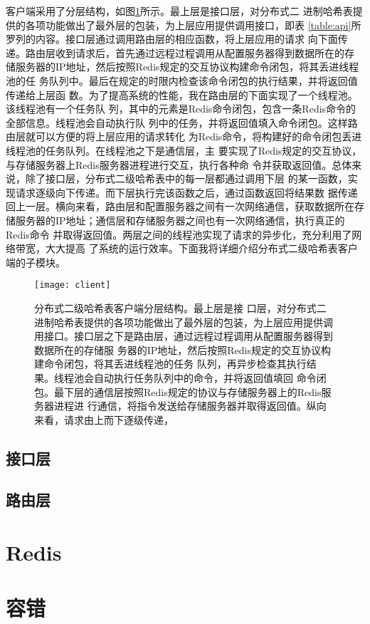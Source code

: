 客户端采用了分层结构，如图\ref{figure:client}所示。最上层是接口层，对分布式二
进制哈希表提供的各项功能做出了最外层的包装，为上层应用提供调用接口，即表
\ref{table:api}所罗列的内容。接口层通过调用路由层的相应函数，将上层应用的请求
向下面传递。路由层收到请求后，首先通过远程过程调用从配置服务器得到数据所在的存
储服务器的IP地址，然后按照Redis规定的交互协议构建命令闭包，将其丢进线程池的任
务队列中。最后在规定的时限内检查该命令闭包的执行结果，并将返回值传递给上层函
数。为了提高系统的性能，我在路由层的下面实现了一个线程池。该线程池有一个任务队
列，其中的元素是Redis命令闭包，包含一条Redis命令的全部信息。线程池会自动执行队
列中的任务，并将返回值填入命令闭包。这样路由层就可以方便的将上层应用的请求转化
为Redis命令，将构建好的命令闭包丢进线程池的任务队列。在线程池之下是通信层，主
要实现了Redis规定的交互协议，与存储服务器上Redis服务器进程进行交互，执行各种命
令并获取返回值。总体来说，除了接口层，分布式二级哈希表中的每一层都通过调用下层
的某一函数，实现请求逐级向下传递。而下层执行完该函数之后，通过函数返回将结果数
据传递回上一层。横向来看，路由层和配置服务器之间有一次网络通信，获取数据所在存
储服务器的IP地址；通信层和存储服务器之间也有一次网络通信，执行真正的Redis命令
并取得返回值。两层之间的线程池实现了请求的异步化，充分利用了网络带宽，大大提高
了系统的运行效率。下面我将详细介绍分布式二级哈希表客户端的子模块。
\begin{figure}
  \centering
  \texttt{[image: client]}
  \caption[分布式二级哈希表客户端]{分布式二级哈希表客户端分层结构。最上层是接
  口层，对分布式二进制哈希表提供的各项功能做出了最外层的包装，为上层应用提供调
  用接口。接口层之下是路由层，通过远程过程调用从配置服务器得到数据所在的存储服
  务器的IP地址，然后按照Redis规定的交互协议构建命令闭包，将其丢进线程池的任务
  队列，再异步检查其执行结果。线程池会自动执行任务队列中的命令，并将返回值填回
  命令闭包。最下层的通信层按照Redis规定的协议与存储服务器上的Redis服务器进程进
  行通信，将指令发送给存储服务器并取得返回值。纵向来看，请求由上而下逐级传递，
  }
  \label{figure:client}
\end{figure}

\subsection{接口层}

\subsection{路由层}


\section{Redis}\label{section:redis}

\section{容错}\label{section:fault}

